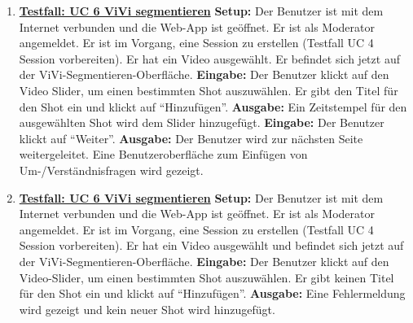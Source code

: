 \begin{enumerate}
	\item \underline{\textbf{Testfall: UC 6 ViVi segmentieren}} \linebreak
	\textbf{Setup:} Der Benutzer ist mit dem Internet verbunden und die Web-App ist geöffnet. Er ist als Moderator angemeldet. Er ist im Vorgang, eine Session zu erstellen (Testfall UC 4 Session vorbereiten). Er hat ein Video ausgewählt. Er befindet sich jetzt auf der ViVi-Segmentieren-Oberfläche.\linebreak
	\textbf{Eingabe:} Der Benutzer klickt auf den Video Slider, um einen bestimmten Shot auszuwählen. Er gibt den Titel für den Shot ein und klickt auf ``Hinzufügen''. \linebreak
	\textbf{Ausgabe:} Ein Zeitstempel für den ausgewählten Shot wird dem Slider hinzugefügt.\linebreak
	\textbf{Eingabe:} Der Benutzer klickt auf ``Weiter''. \linebreak
	\textbf{Ausgabe:} Der Benutzer wird zur nächsten Seite weitergeleitet. Eine Benutzeroberfläche zum Einfügen von Um-/Verständnisfragen wird gezeigt.
	
	\item \underline{\textbf{Testfall: UC 6 ViVi segmentieren}} \linebreak
	\textbf{Setup:} Der Benutzer ist mit dem Internet verbunden und die Web-App ist geöffnet. Er ist als Moderator angemeldet. Er ist im Vorgang, eine Session zu erstellen (Testfall UC 4 Session vorbereiten). Er hat ein Video ausgewählt und befindet sich jetzt auf der ViVi-Segmentieren-Oberfläche.\linebreak
	\textbf{Eingabe:} Der Benutzer klickt auf den Video-Slider, um einen bestimmten Shot auszuwählen. Er gibt keinen Titel für den Shot ein und klickt auf ``Hinzufügen''. \linebreak
	\textbf{Ausgabe:} Eine Fehlermeldung wird gezeigt und kein neuer Shot wird hinzugefügt.
	

\end{enumerate}
